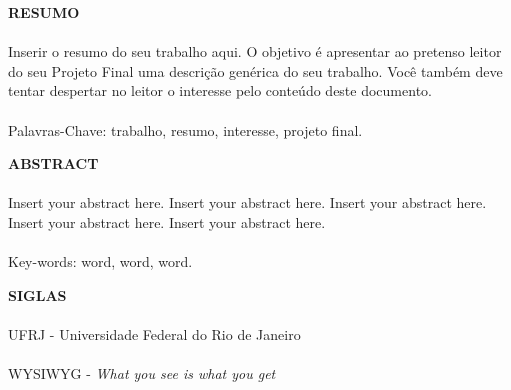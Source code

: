 \pagebreak


\begin{center}
\textbf{RESUMO}
\end{center}
      \vspace{0.5cm}

\paragraph{}Inserir o resumo do seu trabalho aqui. O objetivo é apresentar ao pretenso leitor do seu Projeto Final uma descrição genérica do seu trabalho. Você também deve tentar despertar no leitor o interesse pelo conteúdo deste documento.
\paragraph{}
\noindent Palavras-Chave: trabalho, resumo, interesse, projeto final.

\pagebreak


\begin{center}
\textbf{ABSTRACT}
\end{center}
      \vspace{0.5cm}

\paragraph{}Insert your abstract here. Insert your abstract here. Insert your abstract here. Insert your abstract here. Insert your abstract here.
\paragraph{}
\noindent Key-words: word, word, word.

\pagebreak


\begin{center}
\textbf{SIGLAS}
\end{center}
      \vspace{0.5cm}

\paragraph{}UFRJ - Universidade Federal do Rio de Janeiro
\paragraph{}WYSIWYG - \textit{What you see is what you get}


\pagebreak

